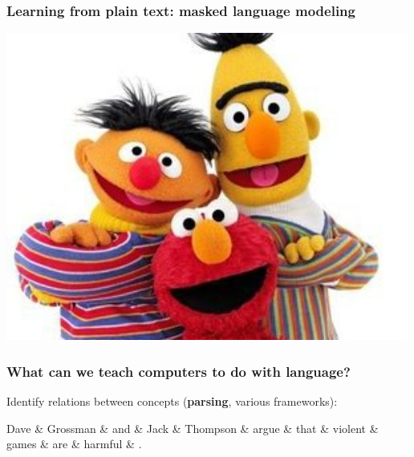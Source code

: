 \documentclass[t,xcolor={svgnames,table}]{beamer}
\begin{document}
\begin{frame}
\frametitle{Learning from plain text: masked language modeling}
\textrm{      }

\vfill
{}

\vspace{-3cm}
\begin{flushright}
\includegraphics[width=.4\textwidth]{sesame.jpg}
\end{flushright}
\end{frame}

\begin{frame}
\frametitle{What can we teach computers to do with language?}
    Identify relations between concepts (\textbf{parsing}, various frameworks):

    \begin{adjustbox}{center}
    \begin{dependency}[line width=2pt,label style={line width=.5pt,draw=black}]
    \begin{deptext}
        Dave  \& Grossman \& and   \& Jack  \& Thompson \& argue \& that  \& violent \& games \& are \& harmful \& .     \\
	\end{deptext}
    \end{dependency}
    \end{adjustbox}
\end{frame}
\end{document}
